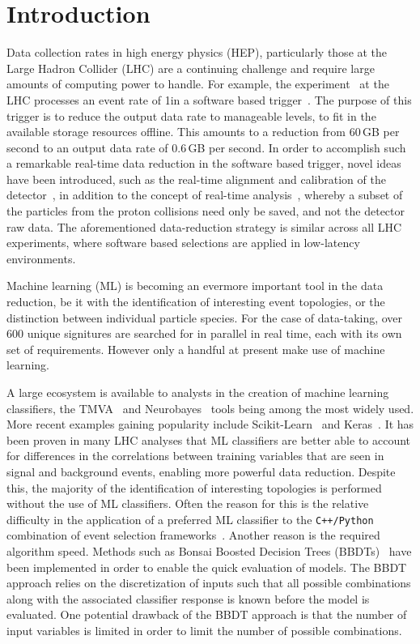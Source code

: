 \section{Introduction}
\label{sec:intro}

Data collection rates in high energy physics (HEP), particularly those at the Large Hadron Collider (LHC)
are a continuing challenge and require large amounts of computing power to handle.
For example, the \lhcb experiment~\cite{Alves:2008zz} at the LHC processes an event rate of 1\mhz in a software
based trigger~\cite{LHCb-DP-2014-002}. The purpose of this trigger is to reduce the output
data rate to manageable levels, \ie to fit in the available storage resources offline.
This amounts to a reduction from 60\,GB per second to an output data rate of 0.6\,GB per second. 
In order to accomplish such a remarkable real-time data reduction in the software based trigger,
novel ideas have been introduced, such as the real-time alignment and calibration of the detector~\cite{Xu:2016mik},
in addition to the concept of real-time analysis~\cite{Aaij:2016rxn}, whereby a subset of the particles from the proton collisions need only
be saved, and not the detector raw data.
The aforementioned data-reduction strategy is similar across all LHC experiments, where
software based selections are applied in low-latency environments.

Machine learning (ML) is becoming an evermore important tool in the data reduction,
be it with the identification of interesting event topologies, or the distinction
between individual particle species. For the case of \lhcb data-taking, over 600
unique signitures are searched for in parallel in real time, each with its own set of requirements.
However only a handful at present make use of machine learning.

A large ecosystem is available to analysts in the creation of machine learning classifiers,
the TMVA~\cite{Hocker:2007ht} and Neurobayes~\cite{Feindt:2006pm} tools being among the most widely used.
More recent examples gaining popularity include Scikit-Learn~\cite{Pedregosa:2012toh}
and Keras~\cite{keras}. It has been proven in many LHC analyses that
ML classifiers are better able to account for differences in the correlations between
training variables that are seen in signal and background events, enabling more
powerful data reduction.
Despite this, the majority of the identification of interesting topologies is performed
without the use of ML classifiers. Often the reason for this is the relative difficulty in
the application of a preferred ML classifier to the {\tt C++/Python} combination
of event selection frameworks~\cite{Barrand:2001ny}. Another 
reason is the required algorithm speed. Methods such as Bonsai
Boosted Decision Trees (BBDTs)~\cite{Gligorov:2012qt} have been implemented in order
to enable the quick evaluation of models. The BBDT approach relies on the 
discretization of inputs such that all possible combinations along with
the associated classifier response is known before the model is evaluated.
One potential drawback of the BBDT approach is that the number of input variables is limited
in order to limit the number of possible combinations. 

